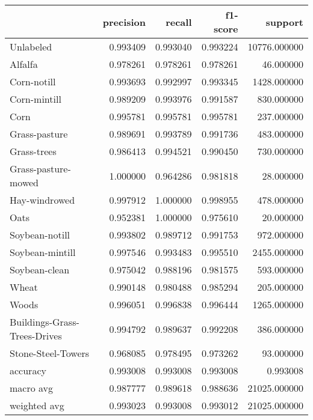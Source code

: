 \begin{tabular}{lrrrr}
\toprule
{} &  precision &    recall &  f1-score &       support \\
\midrule
Unlabeled                    &   0.993409 &  0.993040 &  0.993224 &  10776.000000 \\
Alfalfa                      &   0.978261 &  0.978261 &  0.978261 &     46.000000 \\
Corn-notill                  &   0.993693 &  0.992997 &  0.993345 &   1428.000000 \\
Corn-mintill                 &   0.989209 &  0.993976 &  0.991587 &    830.000000 \\
Corn                         &   0.995781 &  0.995781 &  0.995781 &    237.000000 \\
Grass-pasture                &   0.989691 &  0.993789 &  0.991736 &    483.000000 \\
Grass-trees                  &   0.986413 &  0.994521 &  0.990450 &    730.000000 \\
Grass-pasture-mowed          &   1.000000 &  0.964286 &  0.981818 &     28.000000 \\
Hay-windrowed                &   0.997912 &  1.000000 &  0.998955 &    478.000000 \\
Oats                         &   0.952381 &  1.000000 &  0.975610 &     20.000000 \\
Soybean-notill               &   0.993802 &  0.989712 &  0.991753 &    972.000000 \\
Soybean-mintill              &   0.997546 &  0.993483 &  0.995510 &   2455.000000 \\
Soybean-clean                &   0.975042 &  0.988196 &  0.981575 &    593.000000 \\
Wheat                        &   0.990148 &  0.980488 &  0.985294 &    205.000000 \\
Woods                        &   0.996051 &  0.996838 &  0.996444 &   1265.000000 \\
Buildings-Grass-Trees-Drives &   0.994792 &  0.989637 &  0.992208 &    386.000000 \\
Stone-Steel-Towers           &   0.968085 &  0.978495 &  0.973262 &     93.000000 \\
accuracy                     &   0.993008 &  0.993008 &  0.993008 &      0.993008 \\
macro avg                    &   0.987777 &  0.989618 &  0.988636 &  21025.000000 \\
weighted avg                 &   0.993023 &  0.993008 &  0.993012 &  21025.000000 \\
\bottomrule
\end{tabular}
